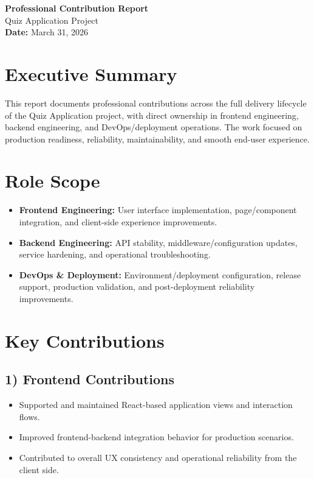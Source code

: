 \documentclass[11pt,a4paper]{article}
\begin{document}
\begin{center}
    {\LARGE \textbf{Professional Contribution Report}}\\[6pt]
    {\large Quiz Application Project}\\[10pt]
    \textbf{Date:} March 31, 2026
\end{center}

\vspace{0.8cm}

\section*{Executive Summary}
This report documents professional contributions across the full delivery lifecycle of the Quiz Application project, with direct ownership in frontend engineering, backend engineering, and DevOps/deployment operations. The work focused on production readiness, reliability, maintainability, and smooth end-user experience.

\section*{Role Scope}
\begin{itemize}
    \item \textbf{Frontend Engineering:} User interface implementation, page/component integration, and client-side experience improvements.
    \item \textbf{Backend Engineering:} API stability, middleware/configuration updates, service hardening, and operational troubleshooting.
    \item \textbf{DevOps \& Deployment:} Environment/deployment configuration, release support, production validation, and post-deployment reliability improvements.
\end{itemize}

\section*{Key Contributions}

\subsection*{1) Frontend Contributions}
\begin{itemize}
    \item Supported and maintained React-based application views and interaction flows.
    \item Improved frontend-backend integration behavior for production scenarios.
    \item Contributed to overall UX consistency and operational reliability from the client side.
\end{itemize}
\end{document}
